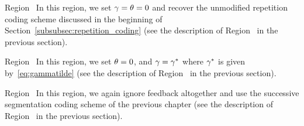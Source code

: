 \begin{LaTeXdescription}
	\item[Region~\Rmnum{12}] In this region, we set $\gamma = \theta = 0$ and recover the unmodified repetition coding scheme discussed in the beginning of Section~\ref{subsubsec:repetition_coding} (see the description of Region~ in the previous section).

	\item[Region~\Rmnum{11}] In this region, we set $\theta = 0$, and $\gamma = \gamma^{*}$ where $\gamma^{*}$ is given by~\eqref{eq:gammatilde} (see the description of Region~ in the previous section).

	
	\item[Region~\Rmnum{10}]  In this region, we again ignore feedback altogether and use the successive segmentation coding scheme of the previous chapter (see the description of Region~ in the previous section).
\end{LaTeXdescription}
